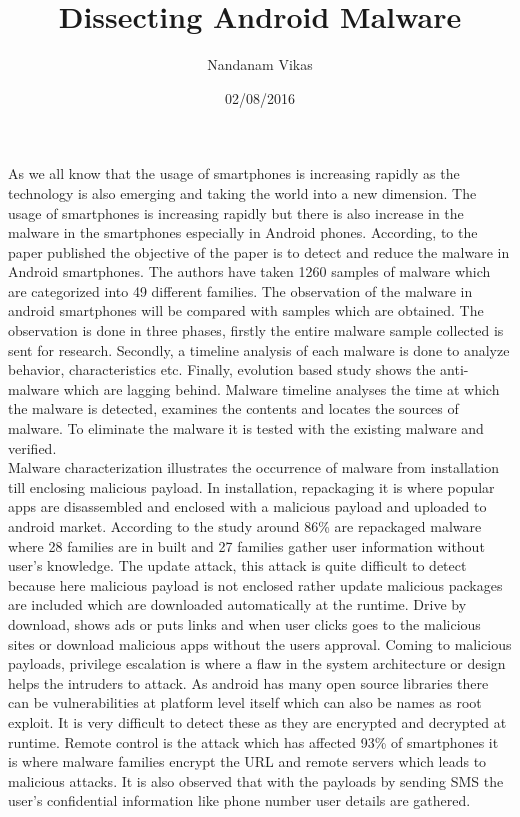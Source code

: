 \documentclass{article}
\title{Dissecting Android Malware}
\author{Nandanam Vikas}
\date{02/08/2016}
\begin{document}
\maketitle
As we all know that the usage of smartphones is increasing rapidly as the technology is also emerging and taking the world into a new dimension. The usage of smartphones is increasing rapidly but there is also increase in the malware in the smartphones especially in Android phones. According, to the paper published the objective of the paper is to detect and reduce the malware in Android smartphones. The authors have taken 1260 samples of malware which are categorized into 49 different families. The observation of the malware in android smartphones will be compared with samples which are obtained. The observation is done in three phases, firstly the entire malware sample collected is sent for research. Secondly, a timeline analysis of each malware is done to analyze behavior, characteristics etc. Finally, evolution based study shows the anti-malware which are lagging behind. Malware timeline analyses the time at which the malware is detected, examines the contents and locates the sources of malware. To eliminate the malware it is tested with the existing malware and verified.\\
Malware characterization illustrates the occurrence of malware from installation till enclosing malicious payload. In installation, repackaging it is where popular apps are disassembled and enclosed with a malicious payload and uploaded to android market. According to the study around 86\% are repackaged malware where 28 families are in built and 27 families gather user information without user’s knowledge. The update attack, this attack is quite difficult to detect because here malicious payload is not enclosed rather update malicious packages are included which are downloaded automatically at the runtime. Drive by download, shows ads or puts links and when user clicks goes to the malicious sites or download malicious apps without the users approval. Coming to malicious payloads, privilege escalation is where a flaw in the system architecture or design helps the intruders to attack. As android has many open source libraries there can be vulnerabilities at platform level itself which can also be names as root exploit. It is very difficult to detect these as they are encrypted and decrypted at runtime. Remote control is the attack which has affected 93\% of smartphones it is where malware families encrypt the URL and remote servers which leads to malicious attacks. It is also observed that with the payloads by sending SMS the user’s confidential information like phone number user details are gathered.\\
\end{document}
